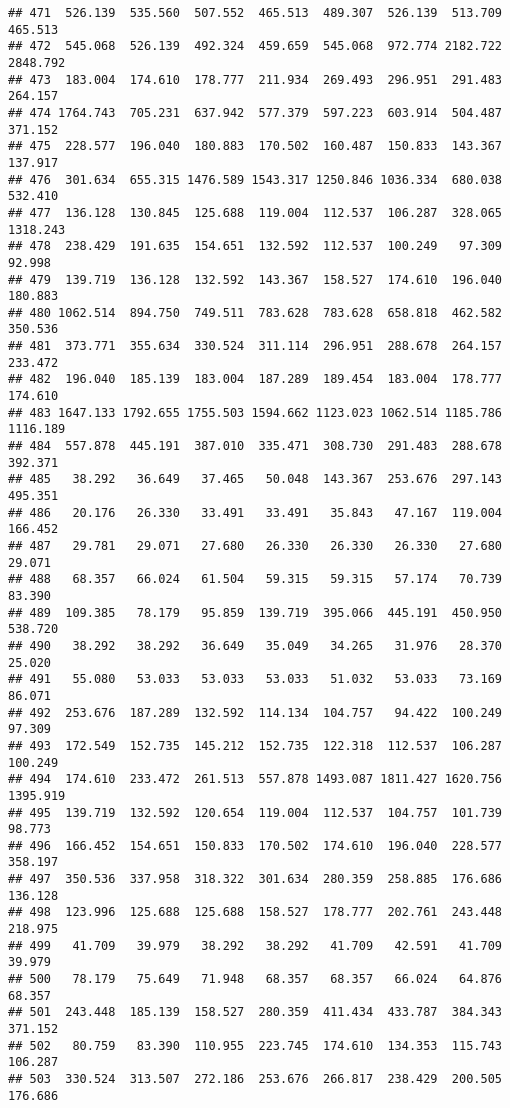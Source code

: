 \documentclass[
]{article}
\begin{document}
\begin{verbatim}
## 471  526.139  535.560  507.552  465.513  489.307  526.139  513.709  465.513
## 472  545.068  526.139  492.324  459.659  545.068  972.774 2182.722 2848.792
## 473  183.004  174.610  178.777  211.934  269.493  296.951  291.483  264.157
## 474 1764.743  705.231  637.942  577.379  597.223  603.914  504.487  371.152
## 475  228.577  196.040  180.883  170.502  160.487  150.833  143.367  137.917
## 476  301.634  655.315 1476.589 1543.317 1250.846 1036.334  680.038  532.410
## 477  136.128  130.845  125.688  119.004  112.537  106.287  328.065 1318.243
## 478  238.429  191.635  154.651  132.592  112.537  100.249   97.309   92.998
## 479  139.719  136.128  132.592  143.367  158.527  174.610  196.040  180.883
## 480 1062.514  894.750  749.511  783.628  783.628  658.818  462.582  350.536
## 481  373.771  355.634  330.524  311.114  296.951  288.678  264.157  233.472
## 482  196.040  185.139  183.004  187.289  189.454  183.004  178.777  174.610
## 483 1647.133 1792.655 1755.503 1594.662 1123.023 1062.514 1185.786 1116.189
## 484  557.878  445.191  387.010  335.471  308.730  291.483  288.678  392.371
## 485   38.292   36.649   37.465   50.048  143.367  253.676  297.143  495.351
## 486   20.176   26.330   33.491   33.491   35.843   47.167  119.004  166.452
## 487   29.781   29.071   27.680   26.330   26.330   26.330   27.680   29.071
## 488   68.357   66.024   61.504   59.315   59.315   57.174   70.739   83.390
## 489  109.385   78.179   95.859  139.719  395.066  445.191  450.950  538.720
## 490   38.292   38.292   36.649   35.049   34.265   31.976   28.370   25.020
## 491   55.080   53.033   53.033   53.033   51.032   53.033   73.169   86.071
## 492  253.676  187.289  132.592  114.134  104.757   94.422  100.249   97.309
## 493  172.549  152.735  145.212  152.735  122.318  112.537  106.287  100.249
## 494  174.610  233.472  261.513  557.878 1493.087 1811.427 1620.756 1395.919
## 495  139.719  132.592  120.654  119.004  112.537  104.757  101.739   98.773
## 496  166.452  154.651  150.833  170.502  174.610  196.040  228.577  358.197
## 497  350.536  337.958  318.322  301.634  280.359  258.885  176.686  136.128
## 498  123.996  125.688  125.688  158.527  178.777  202.761  243.448  218.975
## 499   41.709   39.979   38.292   38.292   41.709   42.591   41.709   39.979
## 500   78.179   75.649   71.948   68.357   68.357   66.024   64.876   68.357
## 501  243.448  185.139  158.527  280.359  411.434  433.787  384.343  371.152
## 502   80.759   83.390  110.955  223.745  174.610  134.353  115.743  106.287
## 503  330.524  313.507  272.186  253.676  266.817  238.429  200.505  176.686

\end{verbatim}
\end{document}
